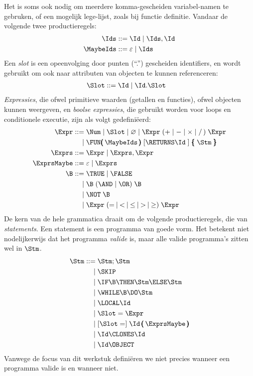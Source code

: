 Het is soms ook nodig om meerdere komma-gescheiden variabel-namen te gebruken, of een mogelijk lege-lijst, zoals bij functie definitie. Vandaar de volgende twee productieregels:
%
\begin{align*}
  \Ids \GrammarDef \Id \mid \Ids, \Id \\
  \MaybeIds \GrammarDef \varepsilon \mid \Ids
\end{align*}
%
Een \emph{slot} is een opeenvolging door punten (``.'') gescheiden identifiers, en wordt gebruikt om ook naar attributen van objecten te kunnen referenceren:
%
\begin{align*}
  \Slot \GrammarDef \Id \mid \Id . \Slot
\end{align*}
%
\emph{Expressies}, die ofwel primitieve waarden (getallen en functies), ofwel objecten kunnen weergeven, en \emph{boolse expressies}, die gebruikt worden voor loops en conditionele executie, zijn als volgt gedefiniëerd:
%
\begin{align*}
  \Expr \GrammarDef \Num \mid \Slot \mid \varnothing \mid \Expr\; (+ \mid - \mid \times \mid /\,)\; \Expr \\
  \GrammarOr \FUN\pmb{(}\,\MaybeIds\,\pmb{)}\; \GrammarOpt{\RETURNS \Id\;} \pmb{\{}\; \Stm\; \pmb{\}} \\
  \Exprs \GrammarDef \Expr \mid \Exprs, \Expr \\
  \ExprsMaybe \GrammarDef \varepsilon \mid \Exprs \\
  \B \GrammarDef \TRUE \mid \FALSE \\
  \GrammarOr \B\; (\AND \mid \OR)\; \B \\
  \GrammarOr \NOT\; \B \\
  \GrammarOr \Expr\; (=\: \mid\: <\: \mid\: \le\: \mid\: >\: \mid\: \ge)\; \Expr
\end{align*}
%
De kern van de hele grammatica draait om de volgende productieregels, die van \emph{statements}. Een statement is een programma van goede vorm. Het betekent niet nodelijkerwijs dat het programma \emph{valide} is, maar alle valide programma's zitten wel in $\Stm$.
%
\begin{align*}
  \Stm \GrammarDef \Stm; \Stm \\
  \GrammarOr \SKIP \\
  \GrammarOr \IF \B \THEN \Stm \ELSE \Stm \\
  \GrammarOr \WHILE \B \DO \Stm \\
  \GrammarOr \LOCAL \Id \\
  \GrammarOr \Slot = \Expr \\
  \GrammarOr \GrammarOpt{\Slot =} \Id\,\pmb{(}\,\ExprsMaybe\,\pmb{)} \\
  \GrammarOr \Id \CLONES \Id \\
  \GrammarOr \Id \OBJECT
\end{align*}
%
Vanwege de focus van dit werkstuk definiëren we niet precies wanneer een programma valide is en wanneer niet.

